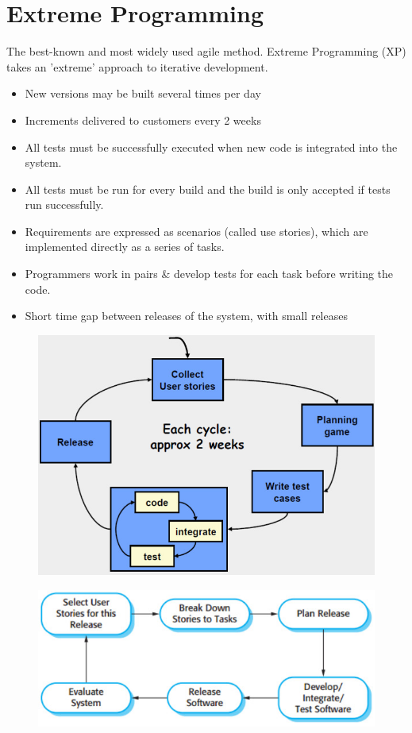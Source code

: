 \documentclass{report}
\begin{document}
\section{Extreme Programming}
\vspace{-1em}
\begin{multicols}{2}
\noindent The best-known and most widely used agile method. Extreme Programming (XP) takes an 'extreme' approach to iterative development.
\begin{itemize}
  \item New versions may be built several times per day
  \item Increments delivered to customers every 2 weeks
  \item All tests must be successfully executed when new code is integrated into the system.
  \item All tests must be run for every build and the build is only accepted if tests run successfully.
  \item Requirements are expressed as scenarios (called use stories), which are implemented directly as a series of tasks.
  \item Programmers work in pairs \& develop tests for each task before writing the code.
  \item Short time gap between releases of the system, with small releases
\end{itemize}
\begin{figure}[H]
\centering
\includegraphics[scale=.25,trim=1cm 1cm 1cm 1cm]{assets/CEN4010_Agile_XP.jpg}
\end{figure}
\begin{figure}[H]
\centering
\includegraphics[scale=.35,trim=1cm 1cm 1cm 1cm]{assets/CEN4010_Agile_XP_Release_Cycle.jpg}
\end{figure}
\end{multicols}
\end{document}
